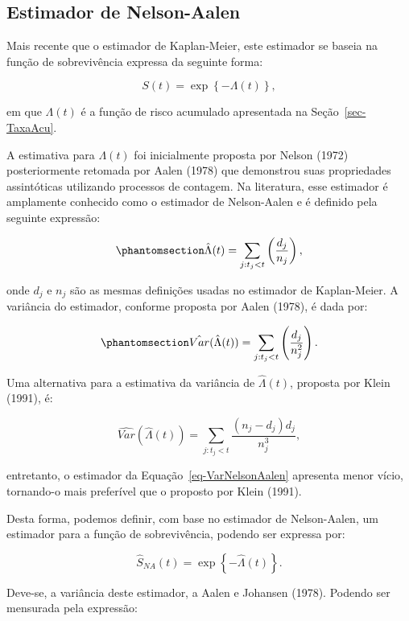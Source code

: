 \documentclass[
  12pt,
  letterpaper,
  DIV=11,
  numbers=noendperiod]{scrreprt}
\begin{document}
\subsection{Estimador de Nelson-Aalen}\label{estimador-de-nelson-aalen}

Mais recente que o estimador de Kaplan-Meier, este estimador se baseia
na função de sobrevivência expressa da seguinte forma:

\[
S(t) = \exp\left\{ - \Lambda(t) \right\},
\]

em que \(\Lambda(t)\) é a função de risco acumulado apresentada na
Seção~\ref{sec-TaxaAcu}.

A estimativa para \(\Lambda(t)\) foi inicialmente proposta por Nelson
(1972) posteriormente retomada por Aalen (1978) que demonstrou suas
propriedades assintóticas utilizando processos de contagem. Na
literatura, esse estimador é amplamente conhecido como o estimador de
Nelson-Aalen e é definido pela seguinte expressão:

\begin{equation}\phantomsection\label{eq-ESTNelsonAalen}{
\hat{\Lambda}(t) = \sum_{j:t_{j} < t} \left( \dfrac{d_{j}}{n_{j}} \right),
}\end{equation}

onde \(d_{j}\) e \(n_{j}\) são as mesmas definições usadas no estimador
de Kaplan-Meier. A variância do estimador, conforme proposta por Aalen
(1978), é dada por:

\begin{equation}\phantomsection\label{eq-VarNelsonAalen}{
\hat{Var}(\hat{\Lambda}(t)) = \sum_{j:t_{j} < t} \left( \dfrac{d_{j}}{n_{j}^{2}} \right).
}\end{equation}

Uma alternativa para a estimativa da variância de \(\hat{\Lambda}(t)\),
proposta por Klein (1991), é:

\[
\hat{Var}(\hat{\Lambda}(t)) = \sum_{j:t_{j} < t} \dfrac{(n_{j} - d_{j})d_{j}}{n_{j}^{3}},
\]

entretanto, o estimador da Equação~\ref{eq-VarNelsonAalen} apresenta
menor vício, tornando-o mais preferível que o proposto por Klein (1991).

Desta forma, podemos definir, com base no estimador de Nelson-Aalen, um
estimador para a função de sobrevivência, podendo ser expressa por:

\[
\hat{S}_{NA}(t) = \exp\left\{- \hat{\Lambda}(t) \right\}.
\]

Deve-se, a variância deste estimador, a Aalen e Johansen (1978). Podendo
ser mensurada pela expressão:
\end{document}
